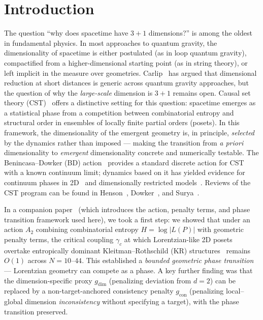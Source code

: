 \documentclass[entropy,article,submit,pdftex,moreauthors]{Definitions/mdpi}
\begin{document}
\section{Introduction}

The question ``why does spacetime have $3{+}1$ dimensions?'' is among the oldest in fundamental physics. In most approaches to quantum gravity, the dimensionality of spacetime is either postulated (as in loop quantum gravity), compactified from a higher-dimensional starting point (as in string theory), or left implicit in the measure over geometries. Carlip~\cite{carlip2017} has argued that dimensional reduction at short distances is generic across quantum gravity approaches, but the question of why the \emph{large-scale} dimension is $3{+}1$ remains open. Causal set theory (CST)~\cite{bombelli1987,sorkin2005} offers a distinctive setting for this question: spacetime emerges as a statistical phase from a competition between combinatorial entropy and structural order in ensembles of locally finite partial orders (posets). In this framework, the dimensionality of the emergent geometry is, in principle, \emph{selected} by the dynamics rather than imposed --- making the transition from \emph{a priori} dimensionality to \emph{emergent} dimensionality concrete and numerically testable. The Benincasa--Dowker (BD) action~\cite{benincasa2010} provides a standard discrete action for CST with a known continuum limit; dynamics based on it has yielded evidence for continuum phases in 2D~\cite{surya2012,loomis2018} and dimensionally restricted models~\cite{cunningham2020}. Reviews of the CST program can be found in Henson~\cite{henson2006}, Dowker~\cite{dowker2005}, and Surya~\cite{surya2019}.

In a companion paper~\cite{zhang2026companion} (which introduces the action, penalty terms, and phase transition framework used here), we took a first step: we showed that under an action $A_2$ combining combinatorial entropy $H = \log|L(P)|$ with geometric penalty terms, the critical coupling $\gamma_c$ at which Lorentzian-like 2D posets overtake entropically dominant Kleitman--Rothschild (KR) structures~\cite{kleitman1975} remains $O(1)$ across $N = 10$--$44$. This established a \emph{bounded geometric phase transition} --- Lorentzian geometry can compete as a phase. A key further finding was that the dimension-specific proxy $g_{\text{dim}}$ (penalizing deviation from $d = 2$) can be replaced by a non-target-anchored consistency penalty $g_{\text{con}}$ (penalizing local--global dimension \emph{inconsistency} without specifying a target), with the phase transition preserved.
\end{document}
